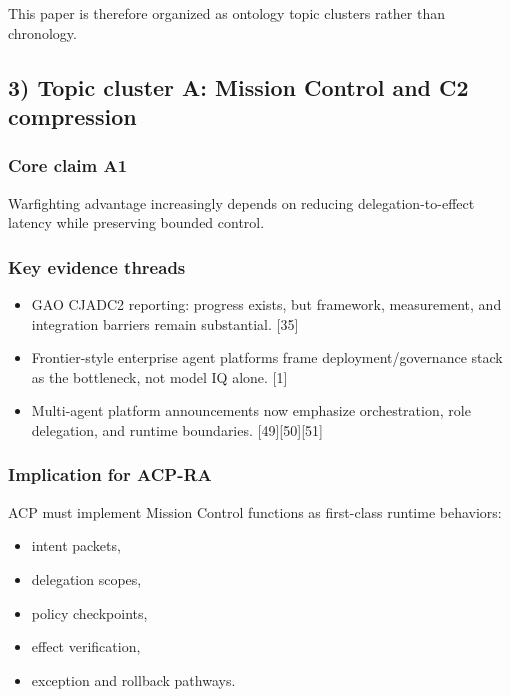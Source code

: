 \documentclass[
]{article}
\providecommand{\tightlist}{%
  \setlength{\itemsep}{0pt}\setlength{\parskip}{0pt}}
\begin{document}
This paper is therefore organized as ontology topic clusters rather than
chronology.

\hypertarget{topic-cluster-a-mission-control-and-c2-compression}{%
\subsection{3) Topic cluster A: Mission Control and C2
compression}\label{topic-cluster-a-mission-control-and-c2-compression}}

\hypertarget{core-claim-a1}{%
\subsubsection{Core claim A1}\label{core-claim-a1}}

Warfighting advantage increasingly depends on reducing
delegation-to-effect latency while preserving bounded control.

\hypertarget{key-evidence-threads}{%
\subsubsection{Key evidence threads}\label{key-evidence-threads}}

\begin{itemize}
\tightlist
\item
  GAO CJADC2 reporting: progress exists, but framework, measurement, and
  integration barriers remain substantial. {[}35{]}
\item
  Frontier-style enterprise agent platforms frame deployment/governance
  stack as the bottleneck, not model IQ alone. {[}1{]}
\item
  Multi-agent platform announcements now emphasize orchestration, role
  delegation, and runtime boundaries. {[}49{]}{[}50{]}{[}51{]}
\end{itemize}

\hypertarget{implication-for-acp-ra}{%
\subsubsection{Implication for ACP-RA}\label{implication-for-acp-ra}}

ACP must implement Mission Control functions as first-class runtime
behaviors:

\begin{itemize}
\tightlist
\item
  intent packets,
\item
  delegation scopes,
\item
  policy checkpoints,
\item
  effect verification,
\item
  exception and rollback pathways.
\end{itemize}
\end{document}

